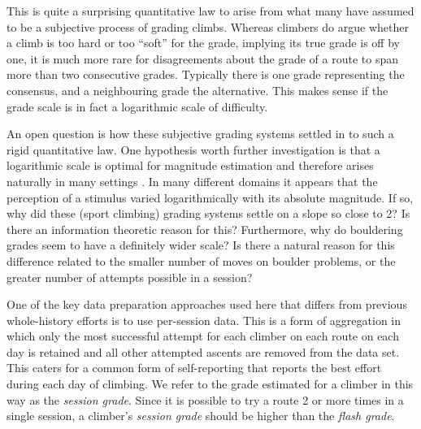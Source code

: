 \documentclass[12pt]{article}
\begin{document}
This is quite a surprising quantitative law to arise from what many have assumed to be a subjective process of grading climbs. Whereas climbers do argue whether a climb is too hard or too ``soft'' for the grade, implying its true grade is off by one, it is much more rare for disagreements about the grade of a route to span more than two consecutive grades. Typically there is one grade representing the consensus, and a neighbouring grade the alternative. This makes sense if the grade scale is in fact a logarithmic scale of difficulty.

An open question is how these subjective grading systems settled in to such a rigid quantitative law. One hypothesis worth further investigation is that a logarithmic scale is optimal for magnitude estimation and therefore arises naturally in many settings \citep{portugal2011weber}. In many different domains it appears that the perception of a stimulus varied logarithmically with its absolute magnitude. If so, why did these (sport climbing) grading systems settle on a slope so close to 2? Is there an information theoretic reason for this? Furthermore, why do bouldering grades seem to have a definitely wider scale? Is there a natural reason for this difference related to the smaller number of moves on boulder problems, or the greater number of attempts possible in a session?

One of the key data preparation approaches used here that differs from previous whole-history efforts is to use per-session data. This is a form of aggregation in which only the most successful attempt for each climber on each route on each day is retained and all other attempted ascents are removed from the data set. This caters for a common form of self-reporting that reports the best effort during each day of climbing. We refer to the grade estimated for a climber in this way as the {\it session grade}. Since it is possible to try a route 2 or more times in a single session, a climber's {\it session grade} should be higher than the {\it flash grade}.
\end{document}
